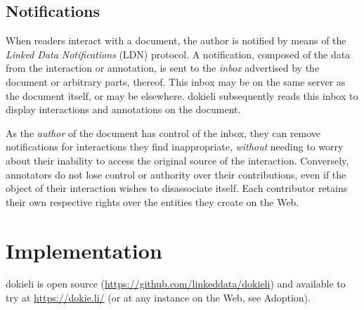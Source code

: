 \documentclass[a4paper]{llncs}
\begin{document}
                                    
                                
                            

                            
                                \subsection{Notifications}
  \label{notifications}

                                
                                    
\par When readers interact with a document, the author is notified by means of the \textit{Linked Data Notifications} (LDN) protocol. A notification, composed of the data from the interaction or annotation, is sent to the \textit{inbox} advertised by the document or arbitrary parts, thereof. This inbox may be on the same server as the document itself, or may be elsewhere. dokieli subsequently reads this inbox to display interactions and annotations on the document.

                                    
\par As the \textit{author} of the document has control of the inbox, they can remove notifications for interactions they find inappropriate, \textit{without} needing to worry about their inability to access the original source of the interaction. Conversely, annotators do not lose control or authority over their contributions, even if the object of their interaction wishes to disassociate itself. Each contributor retains their own respective rights over the entities they create on the Web.
                                
                            
                        
                    

                    
                        \section{Implementation}
  \label{implementation}

                        
                            
\par dokieli is open source (\url{https://github.com/linkeddata/dokieli}) and available to try at \url{https://dokie.li/} (or at any instance on the Web, see \empty Adoption).
\end{document}
